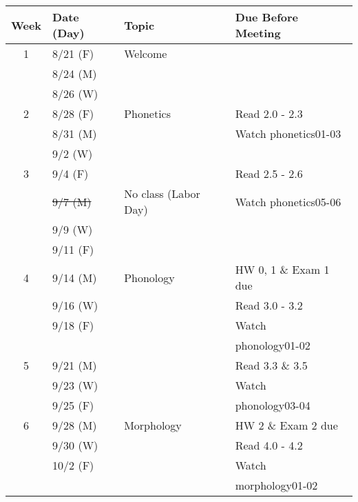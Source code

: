 \documentclass{article}
\begin{document}
    \begin{longtable}{c l l | l}
      Week  & Date (Day)  & Topic                           & Due Before Meeting \\
      \hline
      \hline
      1     & 8/21 (F)    & Welcome                         & \\
            & 8/24 (M)    &                                 & \\
            & 8/26 (W)    &                                 & \\
      \hline
      2     & 8/28 (F)    & Phonetics                       & Read 2.0 - 2.3\\
            & 8/31 (M)    &                                 & Watch phonetics01-03\\
            & 9/2  (W)    &                                 & \\
      \hline
      3     & 9/4  (F)    &                                 & Read 2.5 - 2.6\\
            & \sout{9/7  (M)} & No class (Labor Day)        & Watch phonetics05-06\\
            & 9/9  (W)    &                                 & \\
            & 9/11 (F)    &                                 & \\
      \hline
      4     & 9/14 (M)    & Phonology                       & HW 0, 1 \& Exam 1 due\\
            & 9/16 (W)    &                                 & Read 3.0 - 3.2\\
            & 9/18 (F)    &                                 & Watch\\
            &             &                                 & phonology01-02\\
      \hline
      5     & 9/21 (M)    &                                 & Read 3.3 \& 3.5\\
            & 9/23 (W)    &                                 & Watch\\
            & 9/25 (F)    &                                 & phonology03-04\\
      \hline
      6     & 9/28 (M)    & Morphology                      & HW 2 \& Exam 2 due\\
            & 9/30 (W)    &                                 & Read 4.0 - 4.2\\
            & 10/2 (F)    &                                 & Watch\\
            &             &                                 & morphology01-02\\

\end{longtable}
\end{document}
